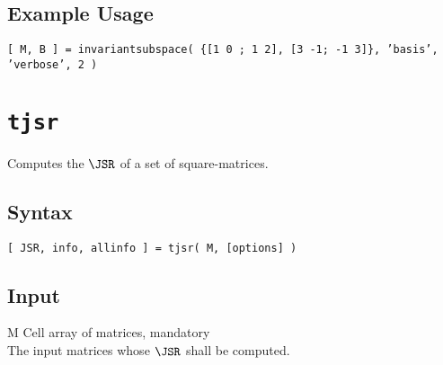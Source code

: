 \subsection*{Example Usage}
\begin{param}
\item[{\texttt{[ M, B ] = invariantsubspace( \{[1 0 ; 1 2], [3 -1; -1 3]\}, 'basis', 'verbose', 2 )}}]
\end{param}




\section{\texttt{tjsr}}\label{tjsr}
Computes the $\JSR$ of a set of square-matrices.
\subsection*{Syntax}
\begin{param}
\item \texttt{[ JSR, info, allinfo ] = tjsr( M, [options] ) }
\end{param}

\subsection*{Input}
\begin{param}
\item[M] Cell array of matrices, mandatory\\The input matrices whose $\JSR$ shall be computed.
\end{param}

